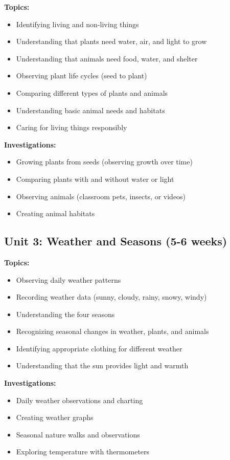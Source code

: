 \documentclass[11pt,letterpaper]{report}
\begin{document}
\textbf{Topics:}
\begin{itemize}
    \item Identifying living and non-living things
    \item Understanding that plants need water, air, and light to grow
    \item Understanding that animals need food, water, and shelter
    \item Observing plant life cycles (seed to plant)
    \item Comparing different types of plants and animals
    \item Understanding basic animal needs and habitats
    \item Caring for living things responsibly
\end{itemize}

\textbf{Investigations:}
\begin{itemize}
    \item Growing plants from seeds (observing growth over time)
    \item Comparing plants with and without water or light
    \item Observing animals (classroom pets, insects, or videos)
    \item Creating animal habitats
\end{itemize}

\subsection{Unit 3: Weather and Seasons (5-6 weeks)}

\textbf{Topics:}
\begin{itemize}
    \item Observing daily weather patterns
    \item Recording weather data (sunny, cloudy, rainy, snowy, windy)
    \item Understanding the four seasons
    \item Recognizing seasonal changes in weather, plants, and animals
    \item Identifying appropriate clothing for different weather
    \item Understanding that the sun provides light and warmth
\end{itemize}

\textbf{Investigations:}
\begin{itemize}
    \item Daily weather observations and charting
    \item Creating weather graphs
    \item Seasonal nature walks and observations
    \item Exploring temperature with thermometers
\end{itemize}
\end{document}
